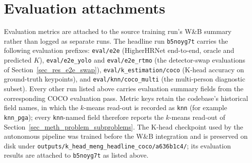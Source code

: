 \section{Evaluation attachments}
\label{appendix_repro_evals}

Evaluation metrics are attached to the source training run's W\&B summary rather than logged as separate runs.
The headline run \texttt{b5noyg7t} carries the following evaluation prefixes:
\texttt{eval/e2e} (HigherHRNet end-to-end, oracle and predicted $K$),
\texttt{eval/e2e\_yolo} and \texttt{eval/e2e\_rtmo} (the detector-swap evaluations of Section~\ref{sec_res_e2e_swap}),
\texttt{eval/k\_estimation/coco} (K-head accuracy on ground-truth keypoints),
and \texttt{eval/knn/coco\_multi} (the multi-person diagnostic subset).
Every other run listed above carries evaluation summary fields from the corresponding COCO evaluation pass.
Metric keys retain the codebase's historical field names,
in which the $k$-means read-out is recorded as \texttt{knn} (for example \texttt{knn\_pga});
every \texttt{knn}-named field therefore reports the $k$-means read-out of Section~\ref{sec_meth_problem_subproblems}.
The K-head checkpoint used by the autonomous pipeline was trained before the W\&B integration
and is preserved on disk under \texttt{outputs/k\_head\_meng\_headline\_coco/a636b1c4/};
its evaluation results are attached to \texttt{b5noyg7t} as listed above.
